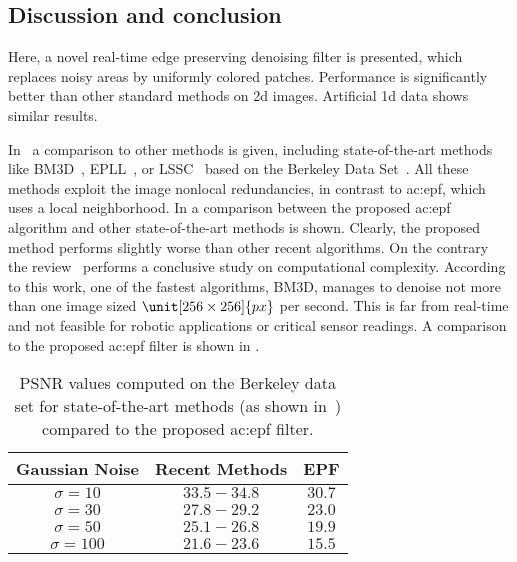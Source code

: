\subsection{Discussion and conclusion}
\label{sec:sensor_discussion}

Here, a novel real-time edge preserving denoising filter is presented, which replaces noisy areas by uniformly colored patches. 
Performance is significantly better than other standard methods on 2d images. 
Artificial 1d data shows similar results.

In~\cite{gu2014weighted} a comparison to other methods is given, including state-of-the-art methods like BM3D~\cite{dabov2007image}, EPLL~\cite{zoran2011learning}, or LSSC~\cite{mairal2009non} based on the Berkeley Data Set~\cite{arbelaez2011contour}. 
All these methods exploit the image nonlocal redundancies, in contrast to \gls{ac:epf}, which uses a local neighborhood. 
In  a comparison between the proposed \gls{ac:epf} algorithm and other state-of-the-art methods is shown.
Clearly, the proposed method performs slightly worse than other recent algorithms.
On the contrary the review~\cite{shao2014heuristic} performs a conclusive study on computational complexity. 
According to this work, one of the fastest algorithms, BM3D, manages to denoise not more than one image sized $\unit[256 \times 256]{px}$ per second. 
This is far from real-time and not feasible for robotic applications or critical sensor readings. 
A comparison to the proposed \gls{ac:epf} filter is shown in .

\begin{table}[]
  \centering
  \begin{tabular}{ccc}
    \toprule
    Gaussian Noise  & Recent Methods & EPF\\
    \midrule
    $\sigma = 10$   & $33.5 - 34.8$ & $30.7$\\
    $\sigma = 30$   & $27.8 - 29.2$ & $23.0$\\
    $\sigma = 50$   & $25.1 - 26.8$ & $19.9$\\
    $\sigma = 100$  & $21.6 - 23.6$ & $15.5$\\
    \bottomrule
  \end{tabular}
  \caption{PSNR values computed on the Berkeley data set for state-of-the-art methods (as shown in~\cite{gu2014weighted}) compared to the proposed \gls{ac:epf} filter.}
  \label{tab:sensor_discussion_psnr}
\end{table}

